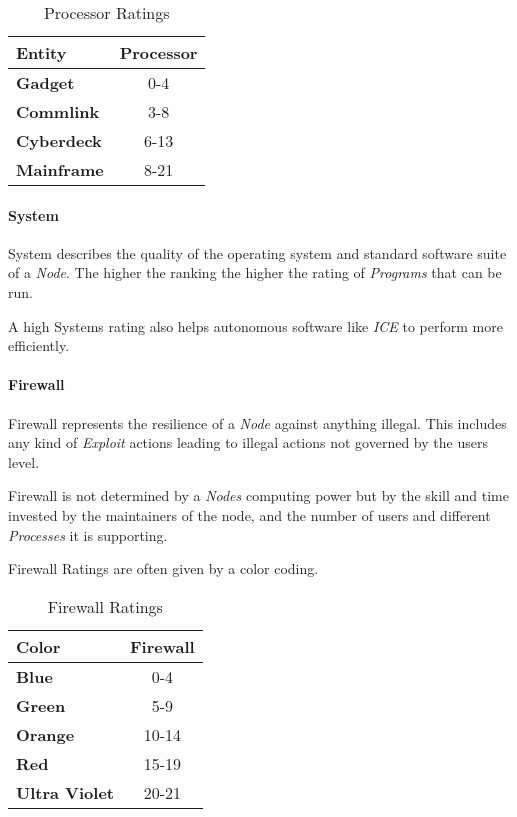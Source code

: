 \begin{table}[htb]
    \caption[Processor Ratings]{Processor Ratings}
    \label{tab:processor ratings}
    \centering
    \begin{tabular}{lc}
        \toprule
        \textbf{Entity}    & \textbf{Processor} \\
        \midrule
        \textbf{Gadget}    & 0-4                \\
        \textbf{Commlink}  & 3-8                \\
        \textbf{Cyberdeck} & 6-13               \\
        \textbf{Mainframe} & 8-21               \\
        \bottomrule
    \end{tabular}
\end{table}


\paragraph{System}

System describes the quality of the operating system and standard software
suite of a \emph{Node}. The higher the ranking the higher the rating of
\emph{Programs} that can be run.

A high Systems rating also helps autonomous software like \emph{ICE} to
perform more efficiently.


\paragraph{Firewall}

Firewall represents the resilience of a \emph{Node} against anything
illegal. This includes any kind of \emph{Exploit} actions leading to
illegal actions not governed by the users level.

Firewall is not determined by a \emph{Nodes} computing power but by
the skill and time invested by the maintainers of the node, and the
number of users and different \emph{Processes} it is supporting.

\hfill

Firewall Ratings are often given by a color coding.

\begin{table}[htb]
    \caption[Firewall Ratings]{Firewall Ratings}
    \label{tab:firwall ratings}
    \centering
    \begin{tabular}{lc}
        \toprule
        \textbf{Color}        & \textbf{Firewall} \\
        \midrule
        \textbf{Blue}         & 0-4               \\
        \textbf{Green}        & 5-9               \\
        \textbf{Orange}       & 10-14             \\
        \textbf{Red}          & 15-19             \\
        \textbf{Ultra Violet} & 20-21             \\
        \bottomrule
    \end{tabular}
\end{table}


